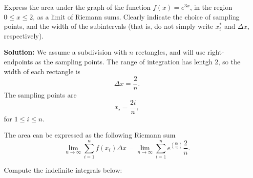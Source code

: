 \documentclass[11pt]{exam}
\begin{document}
%
%
%

\begin{questions}



\addpoints
\question[2] Express the area under the graph of the function $f(x)=e^{3x}$, in the region $0 \leq x \leq 2$, as a limit of Riemann sums. Clearly indicate the choice of sampling points, and the width of the subintervals (that is, do not simply write $x_{i}^{*}$ and $\Delta x$, respectively). 

\textbf{Solution:} We assume a subdivision with $n$ rectangles, and will use right-endpoints as the sampling points. The range of integration has lentgh $2$, so the width of each rectangle is 
\begin{equation*}
\Delta x = \frac{2}{n}.
\end{equation*}
The sampling points are 
\begin{equation*}
x_i=\frac{2i}{n},
\end{equation*}
for $1 \leq i \leq n$. 

The area can be expressed as the following Riemann sum
\begin{equation*}
\lim_{n \to \infty} \sum_{i=1}^{n} f(x_i)\Delta x = \lim_{n \to \infty} \sum_{i=1}^{n} e^{\left(\frac{6i}{n}\right)} \frac{2}{n}.
\end{equation*}
\newpage

\addpoints
\question Compute the indefinite integrals below:
\end{questions}
\end{document}
